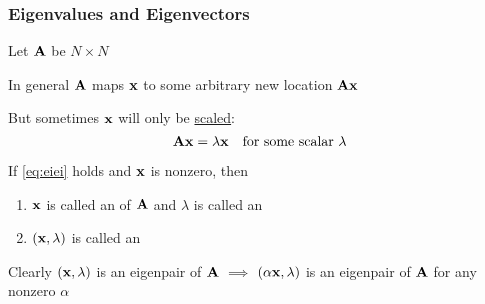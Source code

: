 \begin{frame}

    \frametitle{Eigenvalues and Eigenvectors}

    \vspace{2em}
    Let $\mathbf A$ be $N \times N$  
    
    In general $\mathbf A$ maps ${\mathbf x}$ to some arbitrary new location $\mathbf A {\mathbf x}$

    But sometimes ${\mathbf x}$ will only be \underline{scaled}:
    \begin{equation}
        \label{eq:eiei}
        \mathbf A {\mathbf x} = \lambda {\mathbf x}
        \quad \text{for some scalar $\lambda$}
    \end{equation}
    
    \vspace{.7em}
    If \eqref{eq:eiei} holds and ${\mathbf x}$ is nonzero, then 
    \begin{enumerate}
        \item ${\mathbf x}$ is called an  of $\mathbf A$
            and $\lambda$ is called an 
            \vspace{0.3em}
        \item $({\mathbf x}, \lambda)$ is called an 
    \end{enumerate}

    Clearly $({\mathbf x}, \lambda)$ is an eigenpair of $\mathbf A$ $\implies$
    $(\alpha {\mathbf x}, \lambda)$ is an eigenpair 
    of $\mathbf A$ for any nonzero $\alpha$

\end{frame}

